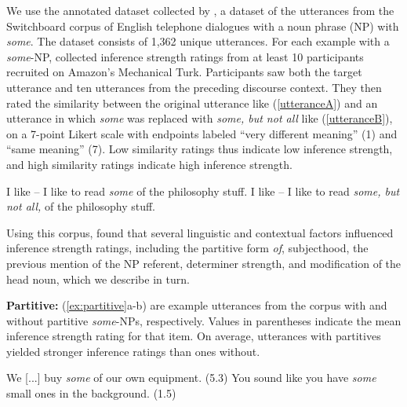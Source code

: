 \documentclass[11pt,a4paper]{article}
\begin{document}
We use the annotated dataset collected by , a dataset of the utterances from the Switchboard corpus of English telephone dialogues \citep{godfrey1992switchboard} with a noun phrase (NP) with \emph{some}.  The dataset consists of 1,362 unique utterances. For each example with a \emph{some}-NP,  collected inference strength ratings from at least 10 participants recruited on Amazon's Mechanical Turk. Participants saw both the target utterance and ten utterances from the preceding discourse context. They then rated the similarity between the original utterance like (\ref{utteranceA}) and an utterance in which \emph{some} was replaced with \emph{some, but not all} like (\ref{utteranceB}), on a 7-point Likert scale with endpoints labeled ``very different meaning'' (1) and ``same meaning'' (7). Low similarity ratings thus indicate low inference strength, and high similarity ratings indicate high inference strength.
\vspace{-.2em}
\begin{exe}
\small
    \ex \begin{xlist}
        \ex \label{utteranceA}I like -- I like to read \emph{some} of the philosophy stuff. 
        \ex \label{utteranceB}I like -- I like to read \emph{some, but not all,} of the philosophy stuff.
    \end{xlist}
\end{exe}
\vspace{-.4em}

Using this corpus,  found that several linguistic and contextual factors influenced inference strength ratings, including the partitive form \emph{of}, subjecthood, the previous mention of the  NP referent, determiner strength, and modification of the head noun, which we describe in turn.

\noindent\textbf{Partitive:}
(\ref{ex:partitive}a-b) are example utterances from the corpus with and without partitive \emph{some}-NPs, respectively. Values in parentheses indicate the mean inference strength rating for that item. On average, utterances with partitives yielded stronger inference ratings than ones without.
\vspace{-.2em}
\begin{exe}
\small
    \ex \label{ex:partitive}  
    \begin{xlist}
    \ex We [...] buy \textit{some} of our own equipment. \hfill (5.3)
    \ex  You sound like you have \emph{some} small ones in the background. \hfill (1.5)
    \end{xlist}
\end{exe}
\vspace{-.4em}
\end{document}
